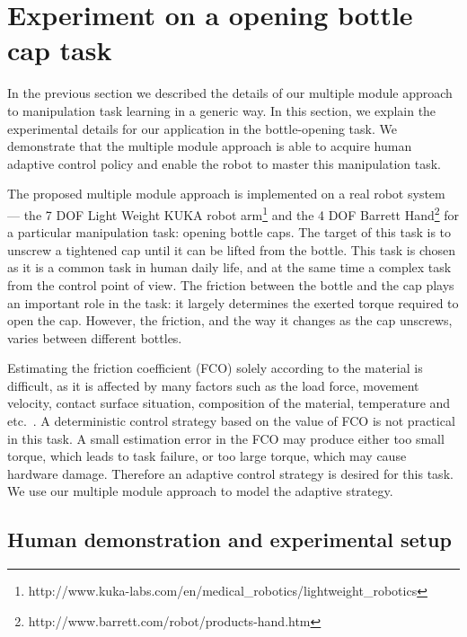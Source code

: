 \section{Experiment on a opening bottle cap task}
\label{cha4:sec3}

In the previous section we described the details of our multiple
module approach to manipulation task learning in a generic way. In this section,
we explain the experimental details for our application in the
bottle-opening task.  We demonstrate that the multiple module approach
is able to acquire human adaptive control policy and enable the robot
to master this manipulation task.

The proposed multiple module approach is implemented on a real robot system
--- the 7 DOF Light Weight KUKA robot arm\footnote{http://www.kuka-labs.com/en/medical\_robotics/lightweight\_robotics} and the 4 DOF Barrett Hand\footnote{http://www.barrett.com/robot/products-hand.htm}
for a particular manipulation task: opening bottle caps. The target of
this task is to unscrew a tightened cap until it can be lifted from
the bottle. This task is chosen as it is a common task in human daily
life, and at the same time a
complex task from the control point of view. The friction between the
bottle and the cap plays an important role in the task: it largely
determines the exerted torque required to open the cap. However, the
friction, and the way it changes as the cap unscrews, varies
between different bottles.


Estimating the friction coefficient (FCO) solely according to the
material is difficult, as it is affected by many factors such as the
load force, movement velocity, contact surface situation, composition
of the material, temperature and
etc.~\citep{gustafssoninvestigation}. A deterministic control strategy
based on the value of FCO is not practical in this task. A small
estimation error in the FCO may produce either too small torque,
which leads to task failure, or too large torque, which may cause
hardware damage. Therefore an adaptive control strategy is desired for
this
task.
We use our multiple module approach to model the adaptive strategy.




\subsection{Human demonstration and experimental setup}
\label{cha4:sec3:experimentsetup}

